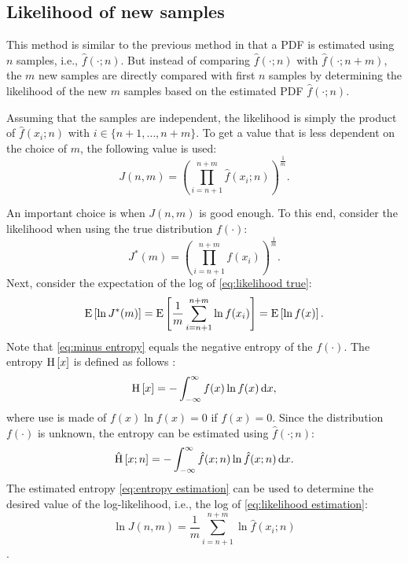 \documentclass[10pt,final,a4paper,oneside,onecolumn]{article}
\newcommand*{\ud}{\mathrm{\,d}}                                 %
\newcommand{\expectation}[1]{\textup{E} \left[ #1 \right]}
\newcommand{\entropy}[1]{\textup{H} \left[ #1 \right]}
\newcommand{\hatentropy}[1]{\hat{\textup{H}} \left[ #1 \right]}
\newcommand{\intinf}{\int_{-\infty}^{\infty}}
\theoremstyle{plain}\newtheorem{definition}{Definition}[section]    %
\theoremstyle{definition}\newtheorem{example}{Example}[section]     %
\theoremstyle{remark}\newtheorem{remarkenv}{Remark}[section]        %
\begin{document}
\subsection{Likelihood of new samples}
\label{sec:likelihood sample based}

This method is similar to the previous method in that a PDF is estimated using $n$ samples, i.e., $\hat{f}(\cdot;n)$. But instead of comparing $\hat{f}(\cdot;n)$ with $\hat{f}(\cdot;n+m)$, the $m$ new samples are directly compared with first $n$ samples by determining the likelihood of the new $m$ samples based on the estimated PDF $\hat{f}(\cdot;n)$. 

Assuming that the samples are independent, the likelihood is simply the product of $\hat{f}(x_i;n)$ with $i \in \{n+1, \ldots, n+m\}$. To get a value that is less dependent on the choice of $m$, the following value is used:
\begin{equation} \label{eq:likelihood estimation}
	J(n, m) = \left( \prod_{i=n+1}^{n+m} \hat{f}(x_i;n) \right)^{\frac{1}{m}}.
\end{equation}

An important choice is when $J(n, m)$ is good enough. To this end, consider the likelihood when using the true distribution $f(\cdot)$:
\begin{equation} \label{eq:likelihood true}
	J^*(m) = \left( \prod_{i=n+1}^{n+m} f(x_i) \right)^{\frac{1}{m}}.
\end{equation}
Next, consider the expectation of the log of \cref{eq:likelihood true}:
\begin{equation} \label{eq:minus entropy}
	\expectation{\ln J^*(m)} = \expectation{ \frac{1}{m}\sum_{i=n+1}^{n+m} \ln f(x_i) } = \expectation{ \ln f(x) }.
\end{equation}
Note that \cref{eq:minus entropy} equals the negative entropy of the $f(\cdot)$. The entropy $\entropy{x}$ is defined as follows \cite{bishop2006pattern}:
\begin{equation} \label{eq:entropy}
	\entropy{x} = -\intinf f(x) \ln f(x) \ud x,
\end{equation}
where use is made of $f(x) \ln f(x) = 0$ if $f(x)=0$. Since the distribution $f(\cdot)$ is unknown, the entropy can be estimated using $\hat{f}(\cdot;n)$:
\begin{equation} \label{eq:entropy estimation}
	\hatentropy{x; n} = -\intinf \hat{f}(x;n) \ln \hat{f}(x;n) \ud x.
\end{equation}
The estimated entropy \cref{eq:entropy estimation} can be used to determine the desired value of the log-likelihood, i.e., the log of \cref{eq:likelihood estimation}:
\begin{equation} \label{eq:loglikelihood estimation}
	\ln J(n, m) = \frac{1}{m} \sum_{i=n+1}^{n+m} \ln \hat{f}(x_i; n)
\end{equation}.
\end{document}
